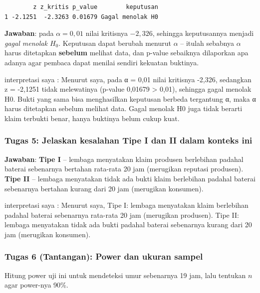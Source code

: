 \documentclass[
  indonesian,
  letterpaper,
]{book}
\begin{document}
\begin{verbatim}
        z z_kritis p_value        keputusan
1 -2.1251  -2.3263 0.01679 Gagal menolak H0
\end{verbatim}

\textbf{Jawaban}: pada \(\alpha = 0{,}01\) nilai kritisnya \(-2{,}326\),
sehingga keputusannya menjadi \emph{gagal menolak \(H_0\)}. Keputusan
dapat berubah menurut \(\alpha\) -- itulah sebabnya \(\alpha\) harus
ditetapkan \textbf{sebelum} melihat data, dan p-value sebaiknya
dilaporkan apa adanya agar pembaca dapat menilai sendiri kekuatan
buktinya.

interpretasi saya : Menurut saya, pada α = 0,01 nilai kritisnya -2,326,
sedangkan z = -2,1251 tidak melewatinya (p-value 0,01679 \textgreater{}
0,01), sehingga gagal menolak H0. Bukti yang sama bisa menghasilkan
keputusan berbeda tergantung α, maka α harus ditetapkan sebelum melihat
data. Gagal menolak H0 juga tidak berarti klaim terbukti benar, hanya
buktinya belum cukup kuat.

\subsubsection{Tugas 5: Jelaskan kesalahan Tipe I dan II dalam konteks
ini}\label{tugas-5-jelaskan-kesalahan-tipe-i-dan-ii-dalam-konteks-ini}

\textbf{Jawaban}: \textbf{Tipe I} -- lembaga menyatakan klaim produsen
berlebihan padahal baterai sebenarnya bertahan rata-rata 20 jam
(merugikan reputasi produsen). \textbf{Tipe II} -- lembaga menyatakan
tidak ada bukti klaim berlebihan padahal baterai sebenarnya bertahan
kurang dari 20 jam (merugikan konsumen).

interpretasi saya : Menurut saya, Tipe I: lembaga menyatakan klaim
berlebihan padahal baterai sebenarnya rata-rata 20 jam (merugikan
produsen). Tipe II: lembaga menyatakan tidak ada bukti padahal baterai
sebenarnya kurang dari 20 jam (merugikan konsumen).

\subsubsection{Tugas 6 (Tantangan): Power dan ukuran
sampel}\label{tugas-6-tantangan-power-dan-ukuran-sampel}

Hitung power uji ini untuk mendeteksi umur sebenarnya 19 jam, lalu
tentukan \(n\) agar power-nya 90\%.
\end{document}
